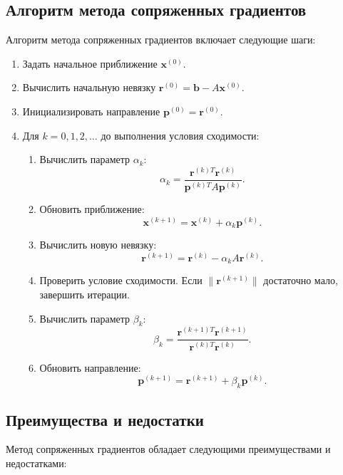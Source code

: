 \documentclass{article}
\begin{document}
\subsection*{Алгоритм метода сопряженных градиентов}

Алгоритм метода сопряженных градиентов включает следующие шаги:

\begin{enumerate}
    \item Задать начальное приближение \(\mathbf{x}^{(0)}\).
    \item Вычислить начальную невязку \(\mathbf{r}^{(0)} = \mathbf{b} - A\mathbf{x}^{(0)}\).
    \item Инициализировать направление \(\mathbf{p}^{(0)} = \mathbf{r}^{(0)}\).
    \item Для \(k = 0, 1, 2, \ldots\) до выполнения условия сходимости:
    \begin{enumerate}
        \item Вычислить параметр \(\alpha_k\):
        \[
        \alpha_k = \frac{\mathbf{r}^{(k)T} \mathbf{r}^{(k)}}{\mathbf{p}^{(k)T} A \mathbf{p}^{(k)}}.
        \]
        \item Обновить приближение:
        \[
        \mathbf{x}^{(k+1)} = \mathbf{x}^{(k)} + \alpha_k \mathbf{p}^{(k)}.
        \]
        \item Вычислить новую невязку:
        \[
        \mathbf{r}^{(k+1)} = \mathbf{r}^{(k)} - \alpha_k A \mathbf{r}^{(k)}.
        \]
        \item Проверить условие сходимости. Если \(\|\mathbf{r}^{(k+1)}\|\) достаточно мало, завершить итерации.
        \item Вычислить параметр \(\beta_k\):
        \[
        \beta_k = \frac{\mathbf{r}^{(k+1)T} \mathbf{r}^{(k+1)}}{\mathbf{r}^{(k)T} \mathbf{r}^{(k)}}.
        \]
        \item Обновить направление:
        \[
        \mathbf{p}^{(k+1)} = \mathbf{r}^{(k+1)} + \beta_k \mathbf{p}^{(k)}.
        \]
    \end{enumerate}
\end{enumerate}

\subsection*{Преимущества и недостатки}

Метод сопряженных градиентов обладает следующими преимуществами и недостатками:
\end{document}
